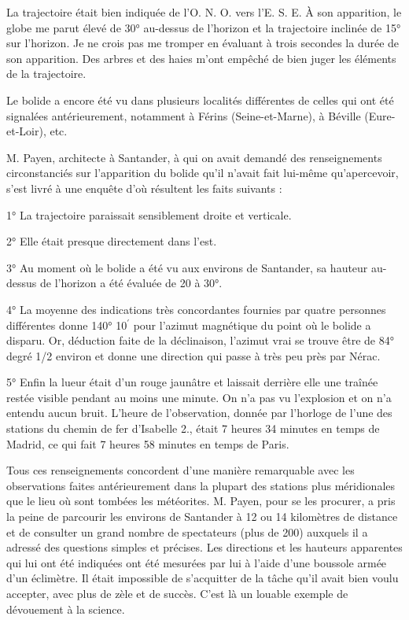 \documentclass[a4paper, 11pt, oneside, polutonikogreek, french]{article}
\begin{document}
La trajectoire était bien indiquée de l'O. N. O. vers l'E. S. E. À son apparition, le globe me parut élevé de 30° au-dessus de l'horizon et la trajectoire inclinée de 15° sur l'horizon. Je ne crois pas me tromper en évaluant à trois secondes la durée de son apparition. Des arbres et des haies m'ont empêché de bien juger les éléments de la trajectoire.

Le bolide a encore été vu dans plusieurs localités différentes de celles qui ont été signalées antérieurement, notamment à Férins (Seine-et-Marne), à Béville (Eure-et-Loir), etc.

M. Payen, architecte à Santander, à qui on avait demandé des renseignements circonstanciés sur l'apparition du bolide qu'il n'avait fait lui-même qu'apercevoir, s'est livré à une enquête d'où résultent les faits suivants :

1° La trajectoire paraissait sensiblement droite et verticale.

2° Elle était presque directement dans l'est.

3° Au moment où le bolide a été vu aux environs de Santander, sa hauteur au-dessus de l'horizon a été évaluée de 20 à 30°.

4° La moyenne des indications très concordantes fournies par quatre personnes différentes donne 140° 10$^{\prime}$ pour l'azimut magnétique du point où le bolide a disparu. Or, déduction faite de la déclinaison, l'azimut vrai se trouve être de 84° degré 1/2 environ et donne une direction qui passe à très peu près par Nérac.

5° Enfin la lueur était d'un rouge jaunâtre et laissait derrière elle une traînée restée visible pendant au moins une minute. On n'a pas vu l'explosion et on n'a entendu aucun bruit. L'heure de l'observation, donnée par l'horloge de l'une des stations du chemin de fer d'Isabelle 2., était 7 heures 34 minutes en temps de Madrid, ce qui fait 7 heures 58 minutes en temps de Paris.

Tous ces renseignements concordent d'une manière remarquable avec les observations faites antérieurement dans la plupart des stations plus méridionales que le lieu où sont tombées les météorites. M. Payen, pour se les procurer, a pris la peine de parcourir les environs de Santander à 12 ou 14 kilomètres de distance et de consulter un grand nombre de spectateurs (plus de 200) auxquels il a adressé des questions simples et précises. Les directions et les hauteurs apparentes qui lui ont été indiquées ont été mesurées par lui à l'aide d'une boussole armée d'un éclimètre. Il était impossible de s'acquitter de la tâche qu'il avait bien voulu accepter, avec plus de zèle et de succès. C'est là un louable exemple de dévouement à la science.
\clearpage
\end{document}
